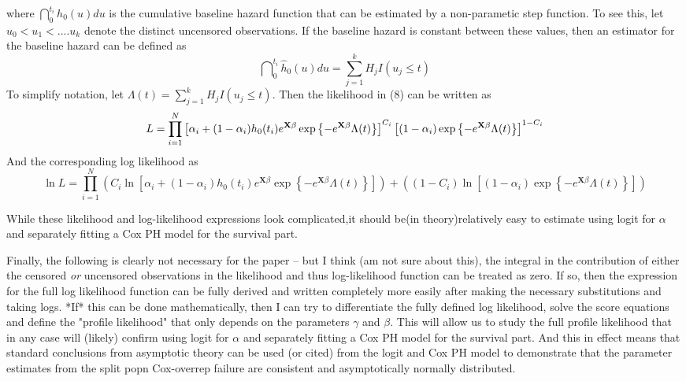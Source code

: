 \documentclass[a4paper, 12pt]{article}
\newcommand {\dsum}{\displaystyle \sum}
\newcommand {\dprod}{\displaystyle \prod}
\begin{document}
where $\dint\nolimits_{0}^{t_{i}}h_{0}(u)du$ is the cumulative baseline
hazard function that can be estimated by a non-parametic step function. To
see this, let $u_{0}<u_{1}<....u_{k}$ denote the distinct uncensored
observations. If the baseline hazard is constant between these values, then
an estimator for the baseline hazard can be defined as%
\begin{equation}
\dint\nolimits_{0}^{t_{i}}\widehat{h}_{0}(u)du=\dsum%
\limits_{j=1}^{k}H_{j}I(u_{j}\leq t)
\end{equation}%
To simplify notation, let $\Lambda
(t)=\dsum\limits_{j=1}^{k}H_{j}I(u_{j}\leq t)$. Then the likelihood in (8)
can be written as%
\begin{equation}
L=\dprod\limits_{i=1}^{N}\left[ \alpha _{i}+(1-\alpha _{i})h_{0}(t_{i})e^{%
\mathbf{X}\beta }\exp \left\{ -e^{\mathbf{X}\beta }\Lambda (t)\right\} %
\right] ^{C_{i}}\left[ (1-\alpha _{i})\exp \left\{ -e^{\mathbf{X}\beta
}\Lambda (t)\right\} \right] ^{1-C_{i}}
\end{equation}%
And the corresponding log likelihood as%
\begin{equation}
\ln L=\dprod\limits_{i=1}^{N}\left( C_{i}\ln \left[ \alpha _{i}+(1-\alpha
_{i})h_{0}(t_{i})e^{\mathbf{X}\beta }\exp \left\{ -e^{\mathbf{X}\beta
}\Lambda (t)\right\} \right] \right) +\left( (1-C_{i})\ln \left[ (1-\alpha
_{i})\exp \left\{ -e^{\mathbf{X}\beta }\Lambda (t)\right\} \right] \right) 
\end{equation}

While these likelihood and log-likelihood expressions look complicated,it
should be(in theory)relatively easy to estimate using logit for $\alpha $
and separately fitting a Cox PH model for the survival part.

Finally, the following is clearly not necessary for the paper -- but I think
(am not sure about this), the integral in the contribution of either the
censored \textit{or }uncensored observations in the likelihood and thus
log-likelihood function can be treated as zero. If so, then the expression
for the full log likelihood function can be fully derived and written
completely more easily after making the necessary substitutions and taking
logs. *If* this can be done mathematically, then I can try to differentiate
the fully defined log likelihood, solve the score equations and define the
"profile likelihood" that only depends on the parameters $\gamma $ and $%
\beta $. This will allow us to study the full profile likelihood that in any
case will (likely) confirm using logit for $\alpha $ and separately fitting
a Cox PH model for the survival part. And this in effect means that standard
conclusions from asymptotic theory can be used (or cited) from the logit and
Cox PH model to demonstrate that the parameter estimates from the split popn
Cox-overrep failure are consistent and asymptotically normally distributed.
\end{document}
